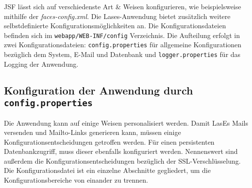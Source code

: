 
JSF lässt sich auf verschiedenste Art \& Weisen konfigurieren, wie beispielsweise
mithilfe der \emph{faces-config.xml}.
Die Lases-Anwendung bietet zusätzlich weitere selbstdefinierte Konfigurationsmöglichkeiten an.
Die Konfigurationsdateien befinden sich im \texttt{webapp/WEB-INF/config} Verzeichnis.\newline
Die Aufteilung erfolgt in zwei Konfigurationsdateien: \texttt{config.properties} für allgemeine Konfigurationen bezüglich dem System, E-Mail und Datenbank und \texttt{logger.properties} für das Logging der Anwendung.

\subsection{Konfiguration der Anwendung durch \texttt{config.properties}}
Die Anwendung kann auf einige Weisen personalisiert werden.
Damit LasEs Mails versenden und Mailto-Links generieren kann,
müssen einige Konfigurationsentscheidungen getroffen werden.
Für einen persistenten Datenbankzugriff, muss dieser ebenfalls konfiguriert werden.
Nennenswert sind außerdem die Konfigurationsentscheidungen bezüglich der SSL-Verschlüsselung.\newline
Die Konfigurationsdatei ist ein einzelne Abschnitte gegliedert, um die Konfigurationsbereiche von einander zu trennen.\newline

